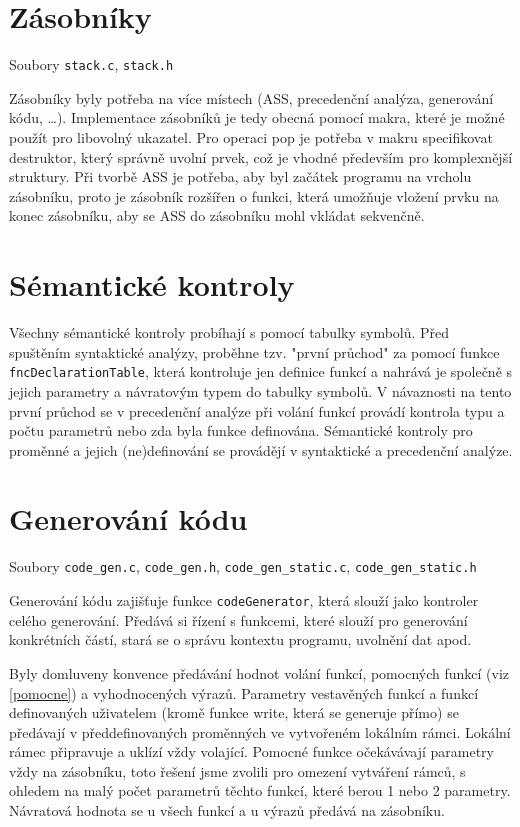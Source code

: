 \documentclass[a4paper, 12pt]{article}
\begin{document}
    \section{Zásobníky} \label{zasobniky}
    Soubory \texttt{stack.c}, \texttt{stack.h}
    
    Zásobníky byly potřeba na více místech (ASS, precedenční analýza, generování kódu, \ldots). Implementace zásobníků je tedy obecná pomocí makra, které je možné použít pro libovolný ukazatel. Pro operaci pop je potřeba v makru specifikovat destruktor, který správně uvolní prvek, což je vhodné především pro komplexnější struktury. Při tvorbě ASS je potřeba, aby byl začátek programu na vrcholu zásobníku, proto je zásobník rozšířen o funkci, která umožňuje vložení prvku na konec zásobníku, aby se ASS do zásobníku mohl vkládat sekvenčně.

    \section{Sémantické kontroly}
    Všechny sémantické kontroly probíhají s pomocí tabulky symbolů. Před spuštěním syntaktické analýzy, proběhne tzv. "první průchod" za pomocí funkce \texttt{fncDeclarationTable}, která kontroluje jen definice funkcí a nahrává je společně s jejich parametry a návratovým typem do tabulky symbolů. V návaznosti na tento první průchod se v precedenční analýze při volání funkcí provádí kontrola typu a počtu parametrů nebo zda byla funkce definována. Sémantické kontroly pro proměnné a jejich (ne)definování se provádějí v syntaktické a precedenční analýze.

    \section{Generování kódu} \label{generovani}
    Soubory \texttt{code\_gen.c}, \texttt{code\_gen.h}, \texttt{code\_gen\_static.c}, \texttt{code\_gen\_static.h}
    
    Generování kódu zajišťuje funkce \texttt{codeGenerator}, která slouží jako kontroler celého generování. Předává si řízení s funkcemi, které slouží pro generování konkrétních částí, stará se o správu kontextu programu, uvolnění dat apod.

    Byly domluveny konvence předávání hodnot volání funkcí, pomocných funkcí (viz \ref{pomocne}) a vyhodnocených výrazů. Parametry vestavěných funkcí a funkcí definovaných uživatelem (kromě funkce write, která se generuje přímo) se předávají v předdefinovaných proměnných ve vytvořeném lokálním rámci. Lokální rámec připravuje a uklízí vždy volající. Pomocné funkce očekávávají parametry vždy na zásobníku, toto řešení jsme zvolili pro omezení vytváření rámců, s ohledem na malý počet parametrů těchto funkcí, které berou 1 nebo 2 parametry. Návratová hodnota se u všech funkcí a u výrazů předává na zásobníku.
\end{document}
